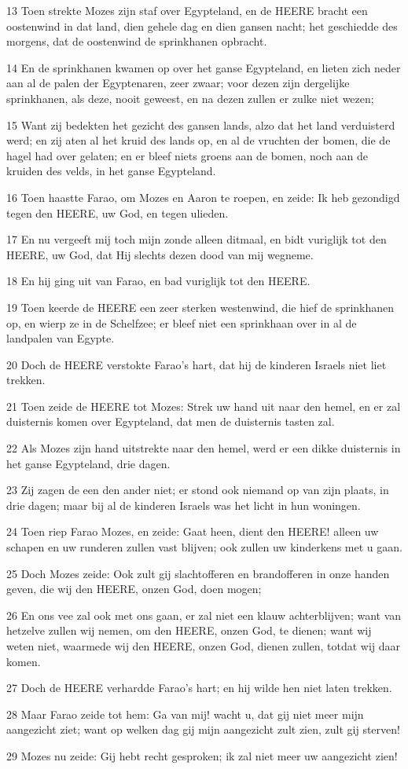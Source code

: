 \par 13 Toen strekte Mozes zijn staf over Egypteland, en de HEERE bracht een oostenwind in dat land, dien gehele dag en dien gansen nacht; het geschiedde des morgens, dat de oostenwind de sprinkhanen opbracht.
\par 14 En de sprinkhanen kwamen op over het ganse Egypteland, en lieten zich neder aan al de palen der Egyptenaren, zeer zwaar; voor dezen zijn dergelijke sprinkhanen, als deze, nooit geweest, en na dezen zullen er zulke niet wezen;
\par 15 Want zij bedekten het gezicht des gansen lands, alzo dat het land verduisterd werd; en zij aten al het kruid des lands op, en al de vruchten der bomen, die de hagel had over gelaten; en er bleef niets groens aan de bomen, noch aan de kruiden des velds, in het ganse Egypteland.
\par 16 Toen haastte Farao, om Mozes en Aaron te roepen, en zeide: Ik heb gezondigd tegen den HEERE, uw God, en tegen ulieden.
\par 17 En nu vergeeft mij toch mijn zonde alleen ditmaal, en bidt vuriglijk tot den HEERE, uw God, dat Hij slechts dezen dood van mij wegneme.
\par 18 En hij ging uit van Farao, en bad vuriglijk tot den HEERE.
\par 19 Toen keerde de HEERE een zeer sterken westenwind, die hief de sprinkhanen op, en wierp ze in de Schelfzee; er bleef niet een sprinkhaan over in al de landpalen van Egypte.
\par 20 Doch de HEERE verstokte Farao's hart, dat hij de kinderen Israels niet liet trekken.
\par 21 Toen zeide de HEERE tot Mozes: Strek uw hand uit naar den hemel, en er zal duisternis komen over Egypteland, dat men de duisternis tasten zal.
\par 22 Als Mozes zijn hand uitstrekte naar den hemel, werd er een dikke duisternis in het ganse Egypteland, drie dagen.
\par 23 Zij zagen de een den ander niet; er stond ook niemand op van zijn plaats, in drie dagen; maar bij al de kinderen Israels was het licht in hun woningen.
\par 24 Toen riep Farao Mozes, en zeide: Gaat heen, dient den HEERE! alleen uw schapen en uw runderen zullen vast blijven; ook zullen uw kinderkens met u gaan.
\par 25 Doch Mozes zeide: Ook zult gij slachtofferen en brandofferen in onze handen geven, die wij den HEERE, onzen God, doen mogen;
\par 26 En ons vee zal ook met ons gaan, er zal niet een klauw achterblijven; want van hetzelve zullen wij nemen, om den HEERE, onzen God, te dienen; want wij weten niet, waarmede wij den HEERE, onzen God, dienen zullen, totdat wij daar komen.
\par 27 Doch de HEERE verhardde Farao's hart; en hij wilde hen niet laten trekken.
\par 28 Maar Farao zeide tot hem: Ga van mij! wacht u, dat gij niet meer mijn aangezicht ziet; want op welken dag gij mijn aangezicht zult zien, zult gij sterven!
\par 29 Mozes nu zeide: Gij hebt recht gesproken; ik zal niet meer uw aangezicht zien!

